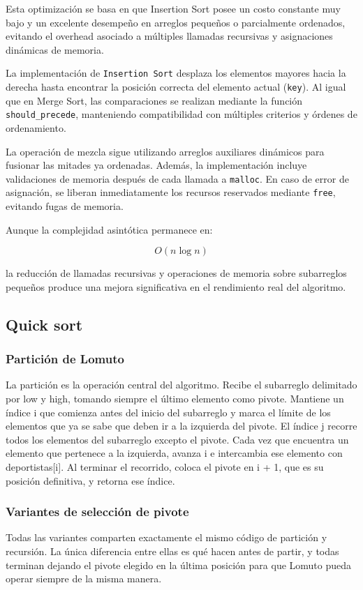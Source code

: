 Esta optimización se basa en que Insertion Sort posee un costo constante muy bajo y un excelente desempeño en arreglos pequeños o parcialmente ordenados, evitando el overhead asociado a múltiples llamadas recursivas y asignaciones dinámicas de memoria.

La implementación de \texttt{Insertion Sort} desplaza los elementos mayores hacia la derecha hasta encontrar la posición correcta del elemento actual (\texttt{key}). Al igual que en Merge Sort, las comparaciones se realizan mediante la función \texttt{should\_precede}, manteniendo compatibilidad con múltiples criterios y órdenes de ordenamiento.

La operación de mezcla sigue utilizando arreglos auxiliares dinámicos para fusionar las mitades ya ordenadas. Además, la implementación incluye validaciones de memoria después de cada llamada a \texttt{malloc}. En caso de error de asignación, se liberan inmediatamente los recursos reservados mediante \texttt{free}, evitando fugas de memoria.

Aunque la complejidad asintótica permanece en:

\[
O(n \log n)
\]

la reducción de llamadas recursivas y operaciones de memoria sobre subarreglos pequeños produce una mejora significativa en el rendimiento real del algoritmo.

\subsection{Quick sort}

\subsubsection{Partición de Lomuto}
La partición es la operación central del algoritmo. Recibe el subarreglo delimitado por low y high, tomando siempre el último elemento como pivote. Mantiene un índice i que comienza antes del inicio del subarreglo y marca el límite de los elementos que ya se sabe que deben ir a la izquierda del pivote. El índice j recorre todos los elementos del subarreglo excepto el pivote. Cada vez que encuentra un elemento que pertenece a la izquierda, avanza i e intercambia ese elemento con deportistas[i]. Al terminar el recorrido, coloca el pivote en i + 1, que es su posición definitiva, y retorna ese índice.

\subsubsection{Variantes de selección de pivote}
Todas las variantes comparten exactamente el mismo código de partición y recursión. La única diferencia entre ellas es qué hacen antes de partir, y todas terminan dejando el pivote elegido en la última posición para que Lomuto pueda operar siempre de la misma manera.

